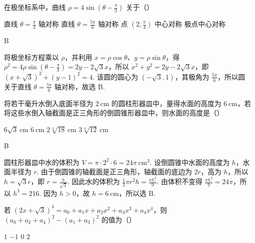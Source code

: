 \begin{problem}
在极坐标系中，曲线 \(\rho=4\sin\left(\theta-\frac{\pi}{3}\right)\) 关于（\quad）

\choices
    {直线 \(\theta = \frac{\pi}{3}\) 轴对称}
    {直线 \(\theta = \frac{5\pi}{6}\) 轴对称}
    {点 \(\left(2, \frac{\pi}{3}\right)\) 中心对称}
    {极点中心对称}
\end{problem}

\begin{answer}
B
\end{answer}

\begin{solution}
将极坐标方程乘以 \(\rho\)，并利用 \(x=\rho\cos\theta\)、\(y=\rho\sin\theta\)，得
\(\rho^2=4\rho\sin\left(\theta-\frac{\pi}{3}\right)=2y-2\sqrt{3}x\)，所以
\(x^2+y^2=2y-2\sqrt{3}x\)，即
\((x+\sqrt{3})^2+(y-1)^2=4\).
该圆的圆心为 \((-\sqrt{3},1)\)，其极角为 \(\frac{5\pi}{6}\)，所以圆关于直线 \(\theta=\frac{5\pi}{6}\) 轴对称，故选 B.
\end{solution}

\begin{problem}
将若干毫升水倒入底面半径为 \(2 \mathrm{~cm}\) 的圆柱形器皿中，量得水面的高度为 \(6 \mathrm{~cm}\)，若将这些水倒入轴截面是正三角形的倒圆锥形器皿中，则水面的高度是（\quad）

\choices
    {\(6\sqrt{3} \mathrm{~cm}\)}
    {\(6 \mathrm{~cm}\)}
    {\(2\sqrt[3]{18} \mathrm{~cm}\)}
    {\(3\sqrt[3]{12} \mathrm{~cm}\)}
\end{problem}

\begin{answer}
B
\end{answer}

\begin{solution}
圆柱形器皿中水的体积为 \(V=\pi\cdot 2^2\cdot 6=24\pi\ \mathrm{cm}^3\). 设倒圆锥中水面的高度为 \(h\)，水面半径为 \(r\). 由于倒圆锥的轴截面是正三角形，轴截面的底边为 \(2r\)，高为 \(h\)，所以 \(h=\sqrt{3}r\)，即 \(r=\frac{h}{\sqrt{3}}\). 因此水的体积为 \(\frac{1}{3}\pi r^2h=\frac{\pi h^3}{9}\). 由体积不变得 \(\frac{\pi h^3}{9}=24\pi\)，所以 \(h^3=216\). 因为 \(h>0\)，故 \(h=6\ \mathrm{cm}\)，所以选 B.
\end{solution}

\begin{problem}
若 \(\left(2x + \sqrt{3}\right)^4 = a_0 + a_1x + a_2x^2 + a_3x^3 + a_4x^4\)，则 \((a_0 + a_2 + a_4)^2 - (a_1 + a_3)^2\) 的值为（\quad）

\choices
    {\(1\)}
    {\(-1\)}
    {\(0\)}
    {\(2\)}
\end{problem}

